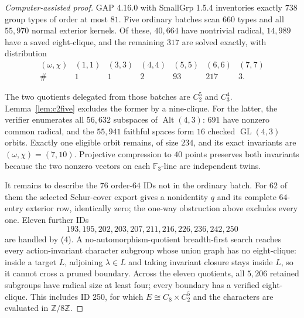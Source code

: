 \documentclass[11pt]{article}
\theoremstyle{remark}
\newcommand{\F}{\mathbb F}
\begin{document}
\begin{proof}[Computer-assisted proof]
GAP 4.16.0 with SmallGrp 1.5.4 inventories exactly $738$ group types of
order at most $81$.  Five ordinary batches scan $660$ types and all
$55{,}970$ normal exterior kernels.  Of these, $40{,}664$ have nontrivial
radical, $14{,}989$ have a saved eight-clique, and the remaining $317$ are
solved exactly, with distribution
\[
\begin{array}{c|rrrrrr}
(\omega,\chi)&(1,1)&(3,3)&(4,4)&(5,5)&(6,6)&(7,7)\\ \hline
\#&1&1&2&93&217&3.
\end{array}
\]

The two quotients delegated from those batches are $C_2^5$ and $C_3^4$.
Lemma~\ref{lem:c2five} excludes the former by a nine-clique.  For the
latter, the verifier enumerates all $56{,}632$ subspaces of
$\operatorname{Alt}(4,3)$: $691$ have nonzero common radical, and the
$55{,}941$ faithful spaces form $16$ checked $\operatorname{GL}(4,3)$
orbits.  Exactly one eligible orbit remains, of size $234$, and its exact
invariants are $(\omega,\chi)=(7,10)$.  Projective compression to $40$
points preserves both invariants because the two nonzero vectors on each
$\F_3$-line are independent twins.

It remains to describe the $76$ order-$64$ IDs not in the ordinary batch.
For $62$ of them the selected Schur-cover export gives a nonidentity $q$ and
its complete $64$-entry exterior row, identically zero; the one-way
obstruction above excludes every one.  Eleven further IDs
\[
193,195,202,203,207,211,216,226,236,242,250
\]
are handled by (4).  A no-automorphism-quotient breadth-first search reaches
every action-invariant character subgroup whose union graph has no
eight-clique: inside a target $L$, adjoining $\lambda\in L$ and taking
invariant closure stays inside $L$, so it cannot cross a pruned boundary.
Across the eleven quotients, all $5{,}206$ retained subgroups have radical
size at least four; every boundary has a verified eight-clique.  This
includes ID 250, for which $E\cong C_8\times C_2^5$ and the characters are
evaluated in $\mathbb Z/8\mathbb Z$.


\end{proof}
\end{document}
